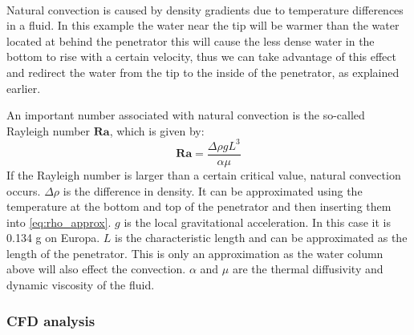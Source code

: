 \\
Natural convection is caused by density gradients due to temperature differences in a fluid. In this example the water near the tip will be warmer than the water located at behind the penetrator this will cause the less dense water in the bottom to rise with a certain velocity, thus we can take advantage of this effect and redirect the water from the tip to the inside of the penetrator, as explained earlier\cite{website:naturalConvectionPdf}.

An important number associated with natural convection is the so-called Rayleigh number $\mathbf{Ra}$, which is given by\cite{website:naturalConvectionWiki}:
\begin{equation}
	\mathbf{Ra} = \frac{\Delta\rho g L^3}{\alpha \mu}
\end{equation}
If the Rayleigh number is larger than a certain critical value, natural convection occurs. $\Delta\rho$ is the difference in density. It can be approximated using the temperature at the bottom and top of the penetrator and then inserting them into \eqref{eq:rho_approx}. $g$ is the local gravitational acceleration. In this case it is 0.134 g on Europa\cite{website:europaGravity}. $L$ is the characteristic length and can be approximated as the length of the penetrator. This is only an approximation as the water column above will also effect the convection. $\alpha$ and $\mu$ are the thermal diffusivity and dynamic viscosity of the fluid. %


\subsubsection{CFD analysis}

